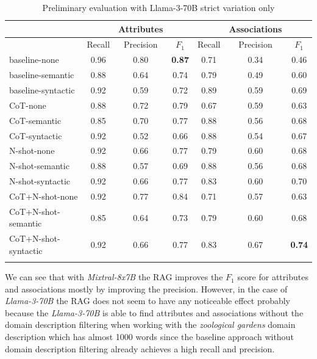 \begin{table}[!h]
    \scriptsize
    \centering
    \setlength{\tabcolsep}{0.5em}
    \begin{tabular}{lcccccc}
    \toprule
         & & Attributes & & & Associations & \\
     \toprule
         & Recall & Precision & $F_1$ & Recall & Precision & $F_1$ \\
    \toprule
    
    \addlinespace
         baseline-none        & 0.96 & 0.80 & \textbf{0.87} & 0.71 & 0.34 & 0.46 \\
    	 baseline-semantic    & 0.88 & 0.64 & 0.74 & 0.79 & 0.49 & 0.60 \\
         baseline-syntactic   & 0.92 & 0.59 & 0.72 & 0.89 & 0.59 & 0.69 \\
         CoT-none             & 0.88 & 0.72 & 0.79 & 0.67 & 0.59 & 0.63 \\
         CoT-semantic         & 0.85 & 0.70 & 0.77 & 0.88 & 0.56 & 0.68 \\
         CoT-syntactic        & 0.92 & 0.52 & 0.66 & 0.88 & 0.54 & 0.67 \\
         N-shot-none          & 0.92 & 0.66 & 0.77 & 0.79 & 0.60 & 0.68 \\
         N-shot-semantic      & 0.88 & 0.57 & 0.69 & 0.88 & 0.56 & 0.68 \\
         N-shot-syntactic     & 0.92 & 0.66 & 0.77 & 0.83 & 0.60 & 0.70 \\
         CoT+N-shot-none      & 0.92 & 0.77 & 0.84 & 0.71 & 0.57 & 0.63 \\
         CoT+N-shot-semantic  & 0.85 & 0.64 & 0.73 & 0.79 & 0.60 & 0.68 \\
         CoT+N-shot-syntactic & 0.92 & 0.66 & 0.77 & 0.83 & 0.67 & \textbf{0.74} \\
    \addlinespace
    \bottomrule
    \addlinespace
    \end{tabular}
    \caption{Preliminary evaluation with Llama-3-70B strict variation only}
    \label{tab:preliminary-llama}
\end{table}

We can see that with \emph{Mixtral-8x7B} the RAG improves the $F_1$ score for attributes and associations mostly by improving the precision. However, in the case of \emph{Llama-3-70B} the RAG does not seem to have any noticeable effect probably because the \emph{Llama-3-70B} is able to find attributes and associations without the domain description filtering when working with the \textit{zoological gardens} domain description which has almost 1000 words since the baseline approach without domain description filtering already achieves a high recall and precision. %


